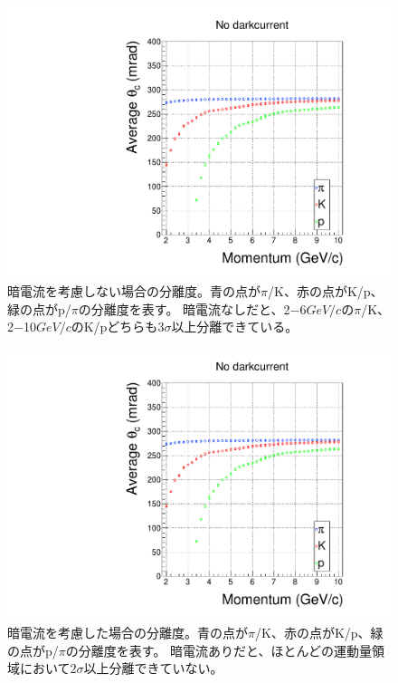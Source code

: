 \begin{figure}
  \centering
  \includegraphics[width=15cm,page=29]{images/chapter4/angleAndMultiGraph.pdf}
  \caption{
    暗電流を考慮しない場合の分離度。青の点が$\pi$/K、赤の点がK/p、緑の点がp/$\pi$の分離度を表す。
    暗電流なしだと、2$-$6\space$\si{GeV/c}$の$\pi$/K、2$-$10\space$\si{GeV/c}$のK/pどちらも$3\sigma$以上分離できている。
  }
  \label{fig:angleMultiGraph3}
\end{figure}
\begin{figure}
  \centering
  \includegraphics[width=15cm,page=30]{images/chapter4/angleAndMultiGraph.pdf}
  \caption{
    暗電流を考慮した場合の分離度。青の点が$\pi$/K、赤の点がK/p、緑の点がp/$\pi$の分離度を表す。
    暗電流ありだと、ほとんどの運動量領域において$2\sigma$以上分離できていない。
  }
  \label{fig:angleMultiGraph4}
\end{figure}